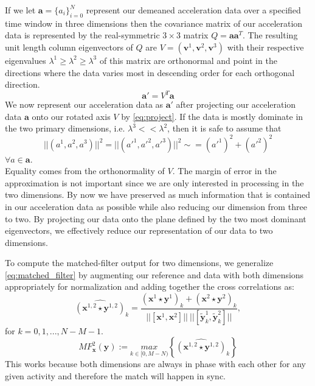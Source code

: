 \documentclass[journal]{IEEEtran}
\begin{document}
If we let $\textbf{a} = \{a_i\}_{i=0}^{N}$ represent our demeaned acceleration data over a specified time window in three dimensions then the covariance matrix of our acceleration data is represented by the real-symmetric $3 \times 3$ matrix $Q = \textbf{a} \textbf{a}^T$.
The resulting unit length column eigenvectors of $Q$ are $V = (\textbf{v}^1,\textbf{v}^2,\textbf{v}^3)$ with their respective eigenvalues $\lambda^1 \geq \lambda^2 \geq \lambda^3$ of this matrix are orthonormal and point in the directions where the data varies most in descending order for each orthogonal direction.
\begin{equation} \label{eq:project}
   \textbf{a}' = V^T \textbf{a}
\end{equation}
%
We now represent our acceleration data as $\textbf{a}'$ after projecting our acceleration data $\textbf{a}$ onto our rotated axis $V$ by \eqref{eq:project}. If the data is mostly dominate in the two primary dimensions, i.e. $\lambda^3 << \lambda^2$, then it is safe to assume that
%
\begin{equation} \label{eq:magnitude}
||(a^1,a^2,a^3)||^2 = ||(a'^1,a'^2,a'^3)||^2 \sim = (a'^1)^2 + (a'^2)^2
\end{equation}
$ \forall a \in \textbf{a}. $ \\
%
Equality comes from the orthonormality of $V$. The margin of error in the approximation is not important since we are only interested in processing in the two dimensions.
By now we have preserved as much information that is contained in our acceleration data as possible while also reducing our dimension from three to two.
By projecting our data onto the plane defined by the two most dominant eigenvectors, we effectively reduce our representation of our data to two dimensions.

To compute the matched-filter output for two dimensions, we generalize \eqref{eq:matched_filter} by augmenting our reference and data with both dimensions appropriately for normalization and adding together the cross correlations as:
%
\begin{equation} \label{eq:cross_correlation_2}
\widehat{(\textbf{x}^{1,2} \star \textbf{y}^{1,2})}_k = \frac{(\textbf{x}^1 \star \textbf{y}^1)_k + (\textbf{x}^2 \star \textbf{y}^2)_k}{||[ \textbf{x}^1, \textbf{x}^2 ]|| \ || [ \widetilde{\textbf{y}}_k^1, \widetilde{\textbf{y}}_k^2 ] || },
\end{equation}
%
for $ k = 0,1,...,N-M-1 $. \\
%
\begin{equation} \label{eq:matched_filter_2}
MF_{\textbf{x}}^2(\textbf{y}) := \underset{k \in [0, M-N)}{max} \left \{\widehat{(\textbf{x}^{1,2} \star \textbf{y}^{1,2})}_k \right \}
\end{equation}
%
This works because both dimensions are always in phase with each other for any given activity and therefore the match will happen in sync.
%
\end{document}
